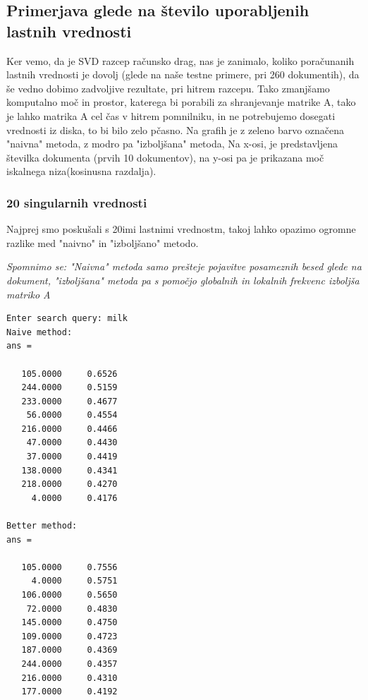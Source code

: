 \documentclass{article}
\begin{document}
\subsection{Primerjava glede na število uporabljenih lastnih vrednosti}
Ker vemo, da je SVD razcep računsko drag, nas je zanimalo, koliko poračunanih lastnih vrednosti je dovolj (glede na naše testne primere, pri 260 dokumentih), da še vedno dobimo zadvoljive rezultate, pri hitrem razcepu. Tako zmanjšamo komputalno moč
in prostor, katerega bi porabili za shranjevanje matrike A, tako je lahko matrika A cel čas v hitrem pomnilniku, in ne potrebujemo dosegati vrednosti iz diska, to bi bilo zelo pčasno.
Na grafih je z zeleno barvo označena "naivna" metoda, z modro pa "izboljšana" metoda, Na x-osi, je predstavljena številka dokumenta (prvih 10 dokumentov), na y-osi pa je prikazana moč iskalnega niza(kosinusna razdalja).

\subsubsection{20 singularnih vrednosti}

Najprej smo poskušali s 20imi lastnimi vrednostm, takoj lahko opazimo ogromne razlike med "naivno" in "izboljšano" metodo.

\textit{Spomnimo se: "Naivna" metoda samo prešteje pojavitve posameznih besed glede na dokument, "izboljšana" metoda pa s pomočjo globalnih in lokalnih frekvenc izboljša matriko A }

\begin{small}
\begin{verbatim}
Enter search query: milk
Naive method:
ans =

   105.0000     0.6526
   244.0000     0.5159
   233.0000     0.4677
    56.0000     0.4554
   216.0000     0.4466
    47.0000     0.4430
    37.0000     0.4419
   138.0000     0.4341
   218.0000     0.4270
     4.0000     0.4176

Better method:
ans =

   105.0000     0.7556
     4.0000     0.5751
   106.0000     0.5650
    72.0000     0.4830
   145.0000     0.4750
   109.0000     0.4723
   187.0000     0.4369
   244.0000     0.4357
   216.0000     0.4310
   177.0000     0.4192    
\end{verbatim}
\end{small}
\end{document}
